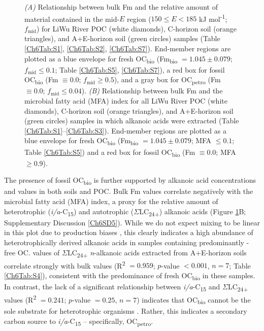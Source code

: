 \begin{figure}[p]
	\caption[$f_{\text{mid}}$ and MFA index vs. Fm mixing plots]{\textit{(A)} Relationship between bulk Fm and the relative amount of material contained in the mid-$E$ region ($150 \leq E < 185$ kJ mol\textsuperscript{-1}; $f_{\text{mid}}$) for LiWu River POC (white diamonds), C-horizon soil (orange triangles), and A+E-horizon soil (green circles) samples (Table \ref{Ch6Tab:S1}, \ref{Ch6Tab:S2}, \ref{Ch6Tab:S7}). End-member regions are plotted as a blue envelope for fresh OC\textsubscript{bio} (Fm\textsubscript{bio} $= 1.045 \pm 0.079$; $f_{\text{mid}} \leq 0.1$; Table \ref{Ch6Tab:S5}, \ref{Ch6Tab:S7}), a red box for fossil OC\textsubscript{bio} (Fm $\equiv 0.0$; $f_{\text{mid}} \geq 0.5$), and a gray box for OC\textsubscript{petro} (Fm $\equiv 0.0$; $f_{\text{mid}} \leq 0.04$). \textit{(B)} Relationship between bulk Fm and the microbial fatty acid (MFA) index for all LiWu River POC (white diamonds), C-horizon soil (orange triangles), and A+E-horizon soil (green circles) samples in which alkanoic acids were extracted (Table \ref{Ch6Tab:S1}--\ref{Ch6Tab:S3}). End-member regions are plotted as a blue envelope for fresh OC\textsubscript{bio} (Fm\textsubscript{bio} $= 1.045 \pm 0.079$; MFA $\leq 0.1$; Table \ref{Ch6Tab:S5}) and a red box for fossil OC\textsubscript{bio} (Fm $\equiv 0.0$; MFA $\geq 0.9$).}
	\label{Ch6Fig:3} 
\end{figure}

The presence of fossil OC\textsubscript{bio} is further supported by alkanoic acid concentrations and  values in both soils and POC. Bulk Fm values correlate negatively with the microbial fatty acid (MFA) index, a proxy for the relative amount of heterotrophic (\textit{i/a}-C\textsubscript{15}) and autotrophic ($\Sigma$LC\textsubscript{24+}) alkanoic acids (Figure \ref{Ch6Fig:3}B; Supplementary Discussion \ref{Ch6SD5}). While we do not expect mixing to be linear in this plot due to production biases \citep{Hemingway:2016bq}, this clearly indicates a high abundance of heterotrophically derived alkanoic acids in samples containing predominantly -free OC.  values of $\Sigma$LC\textsubscript{24+} \textit{n}-alkanoic acids extracted from A+E-horizon soils correlate strongly with bulk  values (R\textsuperscript{2} $= 0.959$; $p$-value $< 0.001$, $n = 7$; Table \ref{Ch6Tab:S4}), consistent with the predominance of fresh OC\textsubscript{bio} in these samples. In contrast, the lack of a significant relationship between \textit{i/a}-C\textsubscript{15} and $\Sigma$LC\textsubscript{24+}  values (R\textsuperscript{2} $= 0.241$; $p$-value $= 0.25$, $n = 7$) indicates that OC\textsubscript{bio} cannot be the sole substrate for heterotrophic organisms \citep{Blair:1985ti}. Rather, this indicates a secondary carbon source to \textit{i/a}-C\textsubscript{15} -- specifically, OC\textsubscript{petro}.

